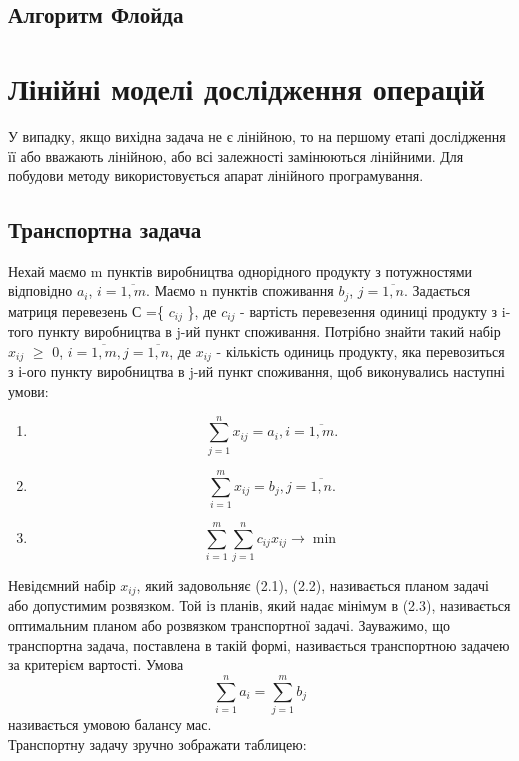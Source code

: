 \documentclass[12pt]{book}
\begin{document}
\section{Алгоритм Флойда}
\chapter{Лінійні моделі дослідження операцій}
У випадку, якщо вихідна задача не є лінійною, то на першому етапі дослідження її або вважають лінійною, або всі залежності замінюються лінійними. Для побудови методу використовується апарат лінійного програмування.
\section{Транспортна задача}
Нехай маємо m пунктів виробництва однорідного продукту з потужностями відповідно $a_i$, $ i =\overline{1, m}$. Маємо n пунктів споживання $b_j$, $ j =\overline{1, n}$. Задається матриця перевезень С =\{ $c_{ij}$ \}, де $c_{ij}$ - вартість перевезення одиниці продукту з i-того пункту виробництва в j-ий пункт споживання. Потрібно знайти такий набір $x_{ij}$ $\geq$ 0, $ i = \overline{1, m}, j = \overline{1, n}$, де  $x_{ij}$ - кількість одиниць продукту, яка перевозиться з і-ого пункту виробництва в j-ий пункт споживання, щоб виконувались наступні умови: 
\begin{enumerate}
\item  \begin{equation}  \sum_{j=1}^n x_{ij} = a_i, i = \overline{1, m}. \end{equation}
\item   \begin{equation} \sum_{i=1}^m x_{ij} = b_j, j = \overline{1, n}.   \end{equation}
\item  \begin{equation} \sum_{i=1}^m \sum_{j=1}^n c_{ij} x_{ij} \to \min  \end{equation}
\end{enumerate}
Невідємний набір $x_{ij}$, який задовольняє (2.1), (2.2), називається планом задачі або допустимим розвязком. Той із планів, який надає мінімум в (2.3), називається оптимальним планом або розвязком транспортної задачі.
Зауважимо, що транспортна задача, поставлена в такій формі, називається транспортною задачею за критерієм вартості.
Умова \begin{equation}  \sum_{i=1}^n a_i = \sum_{j=1}^m b_j  \end{equation} називається умовою балансу мас.\\
Транспортну задачу зручно зображати таблицею:\\
\end{document}
